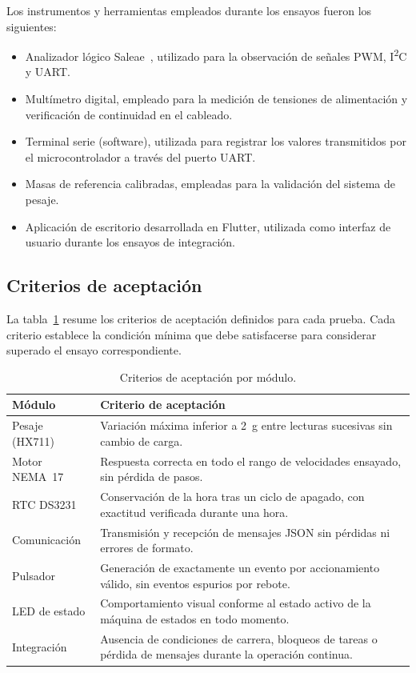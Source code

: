 Los instrumentos y herramientas empleados durante los ensayos fueron los
siguientes:

\begin{itemize}
    \item Analizador lógico Saleae~\cite{saleae}, utilizado para la observación de
    señales PWM, I\textsuperscript{2}C y UART.
    \item Multímetro digital, empleado para la medición de tensiones de
    alimentación y verificación de continuidad en el cableado.
    \item Terminal serie (software), utilizada para registrar los valores
    transmitidos por el microcontrolador a través del puerto UART.
    \item Masas de referencia calibradas, empleadas para la validación del sistema
    de pesaje.
    \item Aplicación de escritorio desarrollada en Flutter, utilizada como interfaz
    de usuario durante los ensayos de integración.
\end{itemize}

\subsection{Criterios de aceptación}

La tabla~\ref{tab:criterios} resume los criterios de aceptación definidos para
cada prueba. Cada criterio establece la condición mínima que debe satisfacerse
para considerar superado el ensayo correspondiente.

\begin{table}[H]
    \centering
    \caption{Criterios de aceptación por módulo.}
    \label{tab:criterios}
    \begin{tabular}{p{3.5cm} p{8.5cm}}
        \hline
        \textbf{Módulo} & \textbf{Criterio de aceptación} \\
        \hline
        Pesaje (HX711) & Variación máxima inferior a 2~g entre lecturas sucesivas
        sin cambio de carga. \\
        Motor NEMA~17 & Respuesta correcta en todo el rango de velocidades
        ensayado, sin pérdida de pasos. \\
        RTC DS3231 & Conservación de la hora tras un ciclo de apagado, con
        exactitud verificada durante una hora. \\
        Comunicación & Transmisión y recepción de mensajes JSON sin pérdidas
        ni errores de formato. \\
        Pulsador & Generación de exactamente un evento por accionamiento
        válido, sin eventos espurios por rebote. \\
        LED de estado & Comportamiento visual conforme al estado activo de la
        máquina de estados en todo momento. \\
        Integración & Ausencia de condiciones de carrera, bloqueos de tareas
        o pérdida de mensajes durante la operación continua. \\
        \hline
    \end{tabular}
\end{table}

